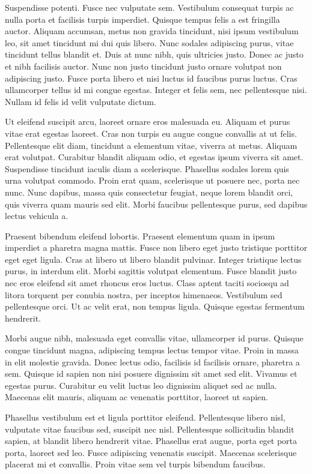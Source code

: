 Suspendisse potenti. Fusce nec vulputate sem. Vestibulum consequat turpis ac nulla porta et facilisis turpis imperdiet. Quisque tempus felis a est fringilla auctor. Aliquam accumsan, metus non gravida tincidunt, nisi ipsum vestibulum leo, sit amet tincidunt mi dui quis libero. Nunc sodales adipiscing purus, vitae tincidunt tellus blandit et. Duis at nunc nibh, quis ultricies justo. Donec ac justo et nibh facilisis auctor. Nunc non justo tincidunt justo ornare volutpat non adipiscing justo. Fusce porta libero et nisi luctus id faucibus purus luctus. Cras ullamcorper tellus id mi congue egestas. Integer et felis sem, nec pellentesque nisi. Nullam id felis id velit vulputate dictum.

Ut eleifend suscipit arcu, laoreet ornare eros malesuada eu. Aliquam et purus vitae erat egestas laoreet. Cras non turpis eu augue congue convallis at ut felis. Pellentesque elit diam, tincidunt a elementum vitae, viverra at metus. Aliquam erat volutpat. Curabitur blandit aliquam odio, et egestas ipsum viverra sit amet. Suspendisse tincidunt iaculis diam a scelerisque. Phasellus sodales lorem quis urna volutpat commodo. Proin erat quam, scelerisque ut posuere nec, porta nec nunc. Nunc dapibus, massa quis consectetur feugiat, neque lorem blandit orci, quis viverra quam mauris sed elit. Morbi faucibus pellentesque purus, sed dapibus lectus vehicula a.

Praesent bibendum eleifend lobortis. Praesent elementum quam in ipsum imperdiet a pharetra magna mattis. Fusce non libero eget justo tristique porttitor eget eget ligula. Cras at libero ut libero blandit pulvinar. Integer tristique lectus purus, in interdum elit. Morbi sagittis volutpat elementum. Fusce blandit justo nec eros eleifend sit amet rhoncus eros luctus. Class aptent taciti sociosqu ad litora torquent per conubia nostra, per inceptos himenaeos. Vestibulum sed pellentesque orci. Ut ac velit erat, non tempus ligula. Quisque egestas fermentum hendrerit.

Morbi augue nibh, malesuada eget convallis vitae, ullamcorper id purus. Quisque congue tincidunt magna, adipiscing tempus lectus tempor vitae. Proin in massa in elit molestie gravida. Donec lectus odio, facilisis id facilisis ornare, pharetra a sem. Quisque id sapien non nisi posuere dignissim sit amet sed elit. Vivamus et egestas purus. Curabitur eu velit luctus leo dignissim aliquet sed ac nulla. Maecenas elit mauris, aliquam ac venenatis porttitor, laoreet ut sapien.

Phasellus vestibulum est et ligula porttitor eleifend. Pellentesque libero nisl, vulputate vitae faucibus sed, suscipit nec nisl. Pellentesque sollicitudin blandit sapien, at blandit libero hendrerit vitae. Phasellus erat augue, porta eget porta porta, laoreet sed leo. Fusce adipiscing venenatis suscipit. Maecenas scelerisque placerat mi et convallis. Proin vitae sem vel turpis bibendum faucibus.

